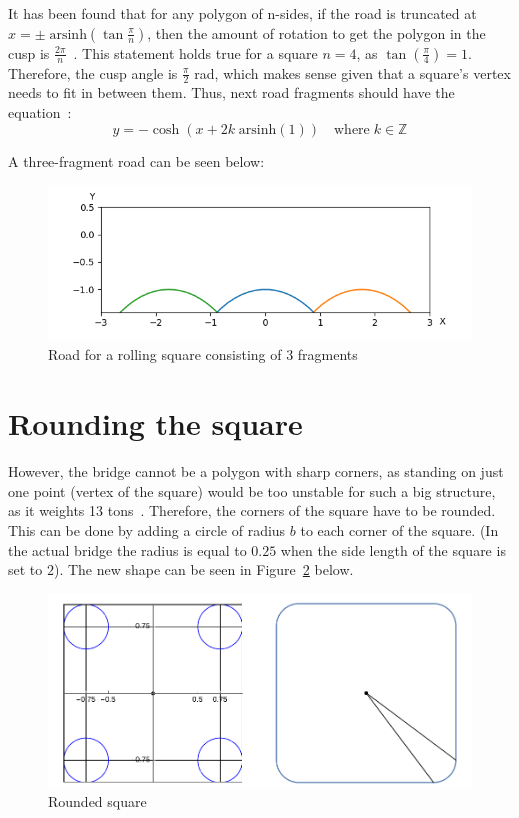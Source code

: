 \documentclass[12pt]{article}
\begin{document}
        It has been found that for any polygon of n-sides, if the road is truncated at $x = \pm \; \text{arsinh}(\tan\frac{\pi}{n})$, then the amount of rotation to get the polygon in the cusp is $\frac{2\pi}{n}$~\cite{Hall_Wagon_1992}. This statement holds true for a square $n=4$, as $\tan(\frac{\pi}{4}) = 1$. Therefore, the cusp angle is $\frac{\pi}{2}$ rad, which makes sense given that a square's vertex needs to fit in between them. Thus, next road fragments should have the equation~\cite{Hall_Wagon_1992}:
        \begin{equation}
            y = - \cosh (x + 2k \;\text{arsinh}(1) ) \quad \text{where}\; k \in \mathbb{Z}
        \end{equation}
        
        A three-fragment road can be seen below:
        \begin{figure}[H]
            \centering
            \includegraphics[width=\linewidth]{images/road_3.png}
            \caption{Road for a rolling square consisting of 3 fragments}\label{fig:road3}
        \end{figure}

    \section{Rounding the square}

        However, the bridge cannot be a polygon with sharp corners, as standing on just one point (vertex of the square) would be too unstable for such a big structure, as it weights 13 tons~\cite{bridge_newatlas}. Therefore, the corners of the square have to be rounded. This can be done by adding a circle of radius $b$ to each corner of the square. (In the actual bridge the radius is equal to $0.25$ when the side length of the square is set to $2$). The new shape can be seen in Figure~\ref{fig:rounded_square} below.

        \begin{figure}[H]
            \centering
            \includegraphics[width=0.9\linewidth]{images/rounded_square.png}
            \caption{Rounded square~\cite{bridge_wolfram}}\label{fig:rounded_square}
        \end{figure}
\end{document}

